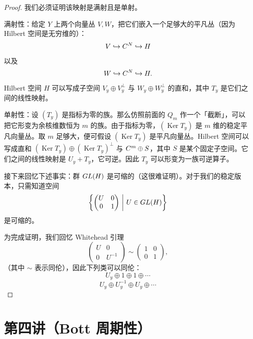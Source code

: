 \begin{proof}
我们必须证明该映射是满射且是单射。

满射性：给定 $Y$ 上两个向量丛 $V,W$，把它们嵌入一个足够大的平凡丛（因为 Hilbert 空间是无穷维的）：
\[ V\hookrightarrow C^N\hookrightarrow H \]
以及
\[ W\hookrightarrow C^N\hookrightarrow H. \]
Hilbert 空间 $H$ 可以写成子空间 $V_y\oplus V_y^{\perp}$ 与 $W_y\oplus W_y^{\perp}$ 的直和，其中 $T_y$ 是它们之间的线性映射。

单射性：设 $(T_y)$ 是指标为零的族。那么仿照前面的 $Q_m$ 作一个「截断」，可以把它形变为余核维数恒为 $m$ 的族。由于指标为零，$(\operatorname{Ker}T_y)$ 是 $m$ 维的稳定平凡向量丛。取 $m$ 足够大，便可假设 $(\operatorname{Ker}T_y)$ 是平凡向量丛。Hilbert 空间可以写成直和 $(\operatorname{Ker}T_y)\oplus(\operatorname{Ker}T_y)^{\perp}$ 与 $C^m\oplus S$，其中 $S$ 是某个固定子空间。它们之间的线性映射是 $U_y+T_y$，它可逆。因此 $T_y$ 可以形变为一族可逆算子。


接下来回忆下述事实：群 $GL(H)$ 是可缩的（这很难证明）。对于我们的稳定版本，只需知道空间
\[ \left\{\begin{pmatrix} U & 0 \\ 0 & 1\end{pmatrix}\ \middle|\ U\in GL(H)\right\} \]
是可缩的。

为完成证明，我们回忆 Whitehead 引理
\[ \begin{pmatrix} U & 0 \\ 0 & U^{-1}\end{pmatrix}\sim\begin{pmatrix} 1 & 0 \\ 0 & 1\end{pmatrix}, \]
（其中 $\sim$ 表示同伦），因此下列类可以同伦：
\[ U_y\oplus 1\oplus 1\oplus\cdots \]
\[ U_y\oplus U_y^{-1}\oplus U_y\oplus\cdots \]
\end{proof}

\section{第四讲（Bott 周期性）}

